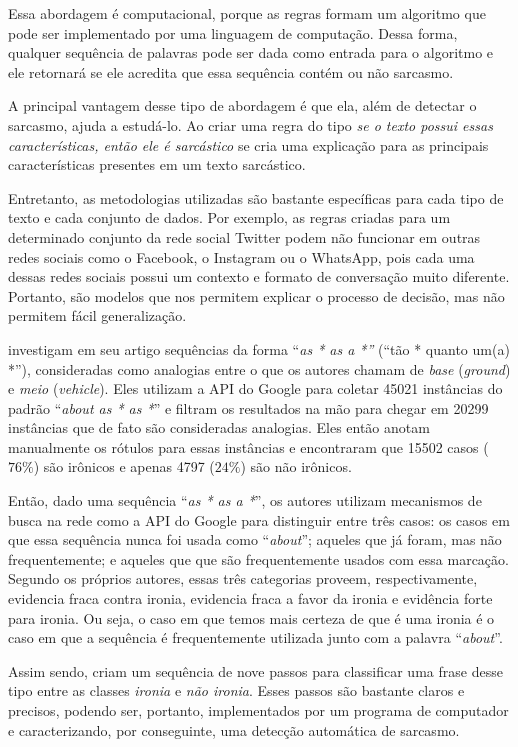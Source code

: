 Essa abordagem é computacional, porque as regras formam um algoritmo que pode
ser implementado por uma linguagem de computação. Dessa forma, qualquer
sequência de palavras pode ser dada como entrada para o algoritmo e ele
retornará se ele acredita que essa sequência contém ou não sarcasmo.

A principal vantagem desse tipo de abordagem é que ela, além de detectar o
sarcasmo, ajuda a estudá-lo. Ao criar uma regra do tipo \textit{se o texto
possui essas características, então ele é sarcástico} se cria uma explicação
para as principais características presentes em um texto sarcástico.

Entretanto, as metodologias utilizadas são bastante específicas para cada tipo
de texto e cada conjunto de dados. Por exemplo, as regras criadas para um
determinado conjunto da rede social Twitter podem não funcionar em outras redes
sociais como o Facebook, o Instagram ou o WhatsApp, pois cada uma dessas redes
sociais possui um contexto e formato de conversação muito diferente. Portanto,
são modelos que nos permitem explicar o processo de decisão, mas não permitem
fácil generalização.

\cite{veale:2010} investigam em seu artigo sequências da forma ``\textit{as * as
a *''} (``tão * quanto um(a) *''), consideradas como analogias entre o que os
autores chamam de \textit{base} (\textit{ground}) e \textit{meio}
(\textit{vehicle}). Eles utilizam a API do Google para coletar 45021 instâncias
do padrão ``\textit{about as * as *}'' e filtram os resultados na mão para
chegar em 20299 instâncias que de fato são consideradas analogias. Eles então
anotam manualmente os rótulos para essas instâncias e encontraram que 15502
casos ($76\%$) são irônicos e apenas 4797 ($24\%$) são não irônicos.

Então, dado uma sequência ``\textit{as * as a *}'', os autores utilizam
mecanismos de busca na rede como a API do Google para distinguir entre três
casos: os casos em que essa sequência nunca foi usada como ``\textit{about}'';
aqueles que já foram, mas não frequentemente; e aqueles que que são
frequentemente usados com essa marcação. Segundo os próprios autores, essas três
categorias proveem, respectivamente, evidencia fraca contra ironia, evidencia
fraca a favor da ironia e evidência forte para ironia. Ou seja, o caso em que
temos mais certeza de que é uma ironia é o caso em que a sequência é
frequentemente utilizada junto com a palavra ``\textit{about}''.

Assim sendo, \cite{veale:2010} criam um sequência de nove passos para
classificar uma frase desse tipo entre as classes \textit{ironia} e \textit{não
ironia}. Esses passos são bastante claros e precisos, podendo ser, portanto,
implementados por um programa de computador e caracterizando, por conseguinte,
uma detecção automática de sarcasmo.


